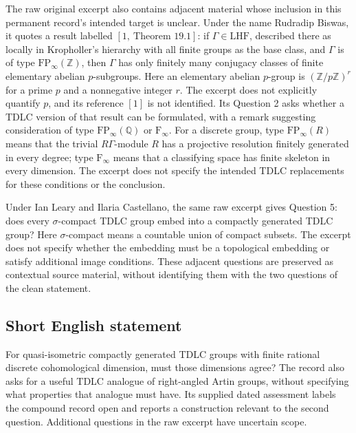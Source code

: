 \documentclass[11pt]{article}
\newcommand{\Z}{\mathbb{Z}}
\newcommand{\Q}{\mathbb{Q}}
\begin{document}
The raw original excerpt also contains adjacent material whose inclusion in this permanent record's intended target is unclear. Under the name Rudradip Biswas, it quotes a result labelled \([1,\ \text{Theorem }19.1]\): if \(\Gamma\in\mathrm{LHF}\), described there as locally in Kropholler's hierarchy with all finite groups as the base class, and \(\Gamma\) is of type \(\mathrm{FP}_{\infty}(\Z)\), then \(\Gamma\) has only finitely many conjugacy classes of finite elementary abelian \(p\)-subgroups. Here an elementary abelian \(p\)-group is \((\Z/p\Z)^r\) for a prime \(p\) and a nonnegative integer \(r\). The excerpt does not explicitly quantify \(p\), and its reference \([1]\) is not identified. Its Question 2 asks whether a TDLC version of that result can be formulated, with a remark suggesting consideration of type \(\mathrm{FP}_{\infty}(\Q)\) or \(\mathrm F_{\infty}\). For a discrete group, type \(\mathrm{FP}_{\infty}(R)\) means that the trivial \(R\Gamma\)-module \(R\) has a projective resolution finitely generated in every degree; type \(\mathrm F_{\infty}\) means that a classifying space has finite skeleton in every dimension. The excerpt does not specify the intended TDLC replacements for these conditions or the conclusion.

Under Ian Leary and Ilaria Castellano, the same raw excerpt gives Question 5: does every \(\sigma\)-compact TDLC group embed into a compactly generated TDLC group? Here \(\sigma\)-compact means a countable union of compact subsets. The excerpt does not specify whether the embedding must be a topological embedding or satisfy additional image conditions. These adjacent questions are preserved as contextual source material, without identifying them with the two questions of the clean statement.
\subsection{Short English statement}
For quasi-isometric compactly generated TDLC groups with finite rational discrete cohomological dimension, must those dimensions agree? The record also asks for a useful TDLC analogue of right-angled Artin groups, without specifying what properties that analogue must have. Its supplied dated assessment labels the compound record open and reports a construction relevant to the second question. Additional questions in the raw excerpt have uncertain scope.
\end{document}
